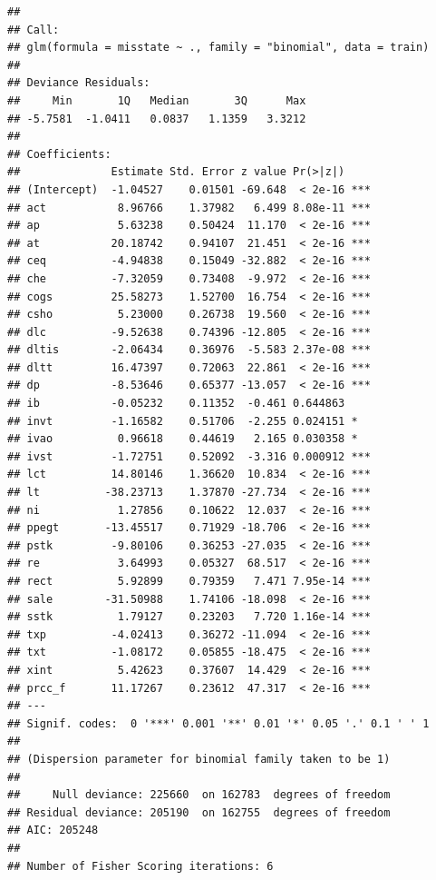 \documentclass[a4paper, nobind]{templates/ociamthesis}
\begin{document}
\begin{verbatim}
## 
## Call:
## glm(formula = misstate ~ ., family = "binomial", data = train)
## 
## Deviance Residuals: 
##     Min       1Q   Median       3Q      Max  
## -5.7581  -1.0411   0.0837   1.1359   3.3212  
## 
## Coefficients:
##              Estimate Std. Error z value Pr(>|z|)    
## (Intercept)  -1.04527    0.01501 -69.648  < 2e-16 ***
## act           8.96766    1.37982   6.499 8.08e-11 ***
## ap            5.63238    0.50424  11.170  < 2e-16 ***
## at           20.18742    0.94107  21.451  < 2e-16 ***
## ceq          -4.94838    0.15049 -32.882  < 2e-16 ***
## che          -7.32059    0.73408  -9.972  < 2e-16 ***
## cogs         25.58273    1.52700  16.754  < 2e-16 ***
## csho          5.23000    0.26738  19.560  < 2e-16 ***
## dlc          -9.52638    0.74396 -12.805  < 2e-16 ***
## dltis        -2.06434    0.36976  -5.583 2.37e-08 ***
## dltt         16.47397    0.72063  22.861  < 2e-16 ***
## dp           -8.53646    0.65377 -13.057  < 2e-16 ***
## ib           -0.05232    0.11352  -0.461 0.644863    
## invt         -1.16582    0.51706  -2.255 0.024151 *  
## ivao          0.96618    0.44619   2.165 0.030358 *  
## ivst         -1.72751    0.52092  -3.316 0.000912 ***
## lct          14.80146    1.36620  10.834  < 2e-16 ***
## lt          -38.23713    1.37870 -27.734  < 2e-16 ***
## ni            1.27856    0.10622  12.037  < 2e-16 ***
## ppegt       -13.45517    0.71929 -18.706  < 2e-16 ***
## pstk         -9.80106    0.36253 -27.035  < 2e-16 ***
## re            3.64993    0.05327  68.517  < 2e-16 ***
## rect          5.92899    0.79359   7.471 7.95e-14 ***
## sale        -31.50988    1.74106 -18.098  < 2e-16 ***
## sstk          1.79127    0.23203   7.720 1.16e-14 ***
## txp          -4.02413    0.36272 -11.094  < 2e-16 ***
## txt          -1.08172    0.05855 -18.475  < 2e-16 ***
## xint          5.42623    0.37607  14.429  < 2e-16 ***
## prcc_f       11.17267    0.23612  47.317  < 2e-16 ***
## ---
## Signif. codes:  0 '***' 0.001 '**' 0.01 '*' 0.05 '.' 0.1 ' ' 1
## 
## (Dispersion parameter for binomial family taken to be 1)
## 
##     Null deviance: 225660  on 162783  degrees of freedom
## Residual deviance: 205190  on 162755  degrees of freedom
## AIC: 205248
## 
## Number of Fisher Scoring iterations: 6
\end{verbatim}
\end{document}
